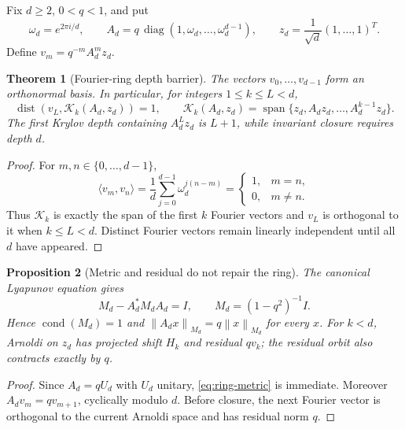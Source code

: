 \documentclass[11pt]{article}
\newtheorem{theorem}{Theorem}[section]
\newtheorem{proposition}[theorem]{Proposition}
\newcommand{\norm}[1]{\left\lVert#1\right\rVert}
\newcommand{\dist}{\operatorname{dist}}
\begin{document}
Fix $d\ge2$, $0<q<1$, and put
\begin{equation}
 \omega_d=e^{2\pi i/d},\qquad
 A_d=q\,\operatorname{diag}(1,\omega_d,\ldots,\omega_d^{d-1}),
 \qquad
 z_d=\frac1{\sqrt d}(1,\ldots,1)^T.
 \label{eq:ring}
\end{equation}
Define $v_m=q^{-m}A_d^mz_d$.

\begin{theorem}[Fourier-ring depth barrier]
\label{thm:ring}
The vectors $v_0,\ldots,v_{d-1}$ form an orthonormal basis.  In particular,
for integers $1\le k\le L<d$,
\begin{equation}
 \dist\!\left(v_L,
 \mathcal K_k(A_d,z_d)\right)=1,
 \qquad
 \mathcal K_k(A_d,z_d)=
 \operatorname{span}\{z_d,A_dz_d,\ldots,A_d^{k-1}z_d\}.
 \label{eq:unit-distance}
\end{equation}
The first Krylov depth containing $A_d^Lz_d$ is $L+1$, while invariant
closure requires depth $d$.
\end{theorem}

\begin{proof}
For $m,n\in\{0,\ldots,d-1\}$,
\[
 \langle v_m,v_n\rangle
 =\frac1d\sum_{j=0}^{d-1}\omega_d^{j(n-m)}
 =\begin{cases}1,&m=n,\\0,&m\ne n.\end{cases}
\]
Thus $\mathcal K_k$ is exactly the span of the first $k$ Fourier vectors and
$v_L$ is orthogonal to it when $k\le L<d$.  Distinct Fourier vectors remain
linearly independent until all $d$ have appeared.
\end{proof}

\begin{proposition}[Metric and residual do not repair the ring]
\label{prop:metric}
The canonical Lyapunov equation gives
\begin{equation}
 M_d-A_d^*M_dA_d=I,
 \qquad M_d=(1-q^2)^{-1}I.
 \label{eq:ring-metric}
\end{equation}
Hence $\operatorname{cond}(M_d)=1$ and
$\norm{A_dx}_{M_d}=q\norm{x}_{M_d}$ for every $x$.  For $k<d$, Arnoldi on
$z_d$ has projected shift $H_k$ and residual $qv_k$; the residual orbit also
contracts exactly by $q$.
\end{proposition}

\begin{proof}
Since $A_d=qU_d$ with $U_d$ unitary, \eqref{eq:ring-metric} is immediate.
Moreover $A_dv_m=qv_{m+1}$, cyclically modulo $d$.  Before closure, the next
Fourier vector is orthogonal to the current Arnoldi space and has residual
norm $q$.
\end{proof}
\end{document}
